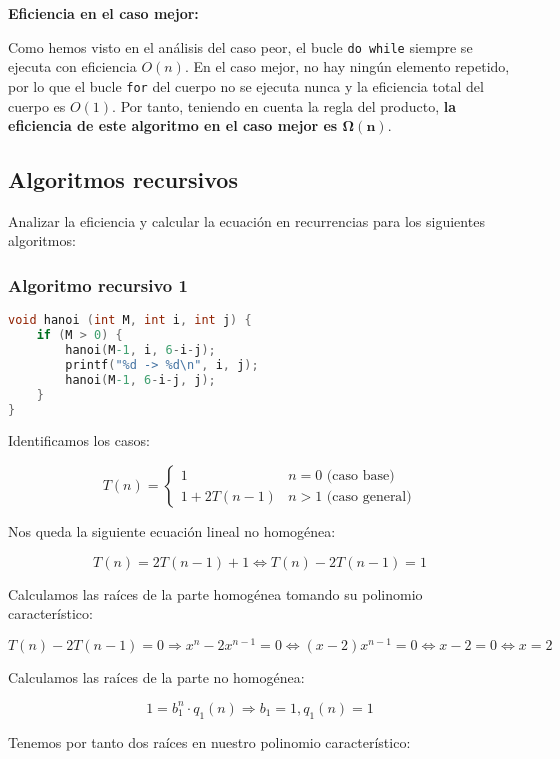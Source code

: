 \textbf{Eficiencia en el caso mejor:}

Como hemos visto en el análisis del caso peor, el bucle \texttt{do while} siempre se ejecuta con eficiencia $O(n)$.
En el caso mejor, no hay ningún elemento repetido, por lo que el bucle \texttt{for} del cuerpo no se ejecuta nunca y la eficiencia total del cuerpo es $O(1)$.
Por tanto, teniendo en cuenta la regla del producto, \textbf{la eficiencia de este algoritmo en el caso mejor es $\boldsymbol{\Omega(n)}$}.

\pagebreak

\subsection{Algoritmos recursivos}\label{eficiencia-recursivos}

Analizar la eficiencia y calcular la ecuación en recurrencias para los siguientes algoritmos:

\subsubsection{Algoritmo recursivo 1}

\begin{lstlisting}[language=C]
void hanoi (int M, int i, int j) {
	if (M > 0) {
		hanoi(M-1, i, 6-i-j);
		printf("%d -> %d\n", i, j);
		hanoi(M-1, 6-i-j, j);
	}
}
\end{lstlisting}

Identificamos los casos:

\[T(n)=
\begin{cases}
	1         & n=0\text{ (caso base)} \\
	1+2T(n-1) & n>1\text{ (caso general)}
\end{cases}
\]

Nos queda la siguiente ecuación lineal no homogénea:

\[T(n)=2T(n-1)+1\Leftrightarrow T(n)-2T(n-1)=1\]

Calculamos las raíces de la parte homogénea tomando su polinomio característico:

\[T(n)-2T(n-1)=0\Rightarrow x^n-2x^{n-1}=0\Leftrightarrow(x-2)x^{n-1}=0\Leftrightarrow x-2=0\Leftrightarrow x=2\]

Calculamos las raíces de la parte no homogénea:

\[1=b_1^n\cdot q_1(n)\Rightarrow b_1=1,q_1(n)=1\]

Tenemos por tanto dos raíces en nuestro polinomio característico:

